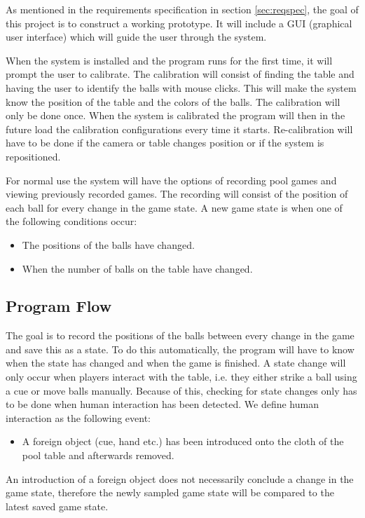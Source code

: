 As mentioned in the requirements specification in section \ref{sec:reqspec}, the goal of this project is to construct a working prototype. It will include a GUI (graphical user interface) which will guide the user through the system.

When the system is installed and the program runs for the first time, it will prompt the user to calibrate. The calibration will consist of finding the table and having the user to identify the balls with mouse clicks. This will make the system know the position of the table and the colors of the balls. The calibration will only be done once. When the system is calibrated the program will then in the future load the calibration configurations every time it starts. Re-calibration will have to be done if the camera or table changes position or if the system is repositioned.

For normal use the system will have the options of recording pool games and viewing previously recorded games. The recording will consist of the position of each ball for every change in the game state. A new game state is when one of the following conditions occur: 
\begin{itemize}
	\item The positions of the balls have changed.
	\item When the number of balls on the table have changed.
\end{itemize}

\subsection{Program Flow}
The goal is to record the positions of the balls between every change in the game and save this as a state. To do this automatically, the program will have to know when the state has changed and when the game is finished. A state change will only occur when players interact with the table, i.e. they either strike a ball using a cue or move balls manually. Because of this, checking for state changes only has to be done when human interaction has been detected. We define human interaction as the following event:
\begin{itemize}
	\item  A foreign object (cue, hand etc.) has been introduced onto the cloth of the pool table and afterwards removed.
\end{itemize}

An introduction of a foreign object does not necessarily conclude a change in the game state, therefore the newly sampled game state will be compared to the latest saved game state.

